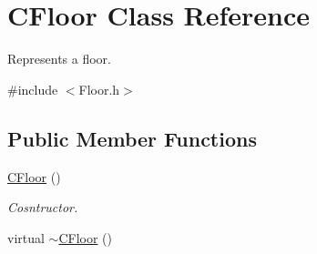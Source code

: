 \hypertarget{class_c_floor}{\section{C\+Floor Class Reference}
\label{class_c_floor}
}


Represents a floor.  




{\ttfamily \#include $<$Floor.\+h$>$}

\subsection*{Public Member Functions}
\begin{DoxyCompactItemize}
\item 
\hypertarget{class_c_floor_af437bdb8f830e3ecf6f19d6eebdf56c1}{\hyperlink{class_c_floor_af437bdb8f830e3ecf6f19d6eebdf56c1}{C\+Floor} ()}\label{class_c_floor_af437bdb8f830e3ecf6f19d6eebdf56c1}

\begin{DoxyCompactList}\small\item\em Cosntructor. \end{DoxyCompactList}\item 
\hypertarget{class_c_floor_abd1acd7879d4eb83db8792db677ace93}{virtual \hyperlink{class_c_floor_abd1acd7879d4eb83db8792db677ace93}{$\sim$\+C\+Floor} ()}\label{class_c_floor_abd1acd7879d4eb83db8792db677ace93}


\end{DoxyCompactItemize}
